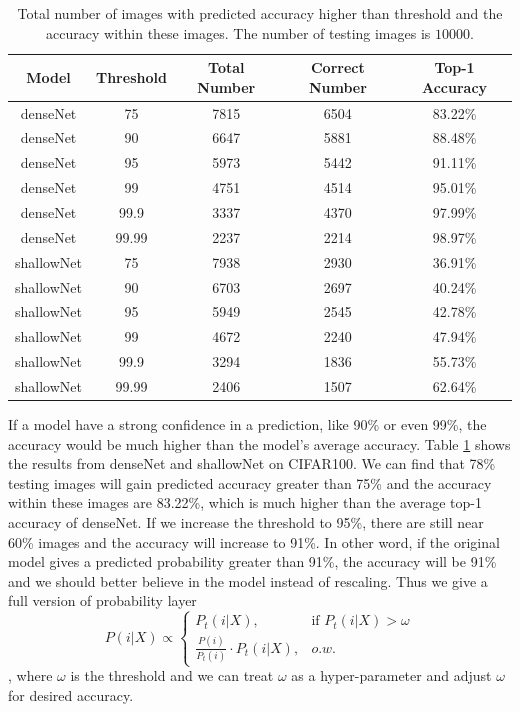 \documentclass{article}
\begin{document}
\begin{table}
\begin{center}
\begin{tabular}{ |c|c|c|c|c| } 
 \hline
 Model & Threshold & Total Number & Correct Number & Top-1 Accuracy \\
 \hline
 denseNet & 75 & 7815 & 6504 & 83.22\% \\
 \hline
 denseNet & 90 & 6647 & 5881 & 88.48\% \\
 \hline
 denseNet & 95 & 5973 & 5442 & 91.11\% \\
 \hline
 denseNet & 99 & 4751 & 4514 & 95.01\% \\
 \hline
 denseNet & 99.9 & 3337 & 4370 & 97.99\% \\
 \hline
 denseNet & 99.99 & 2237 & 2214 & 98.97\% \\
 \hline
 shallowNet & 75 & 7938 & 2930 & 36.91\% \\
 \hline
 shallowNet & 90 & 6703 & 2697 & 40.24\% \\
 \hline
 shallowNet & 95 & 5949 & 2545 & 42.78\% \\
 \hline
 shallowNet & 99 & 4672 & 2240 & 47.94\% \\
 \hline
 shallowNet & 99.9 & 3294 & 1836 & 55.73\% \\
 \hline
 shallowNet & 99.99 & 2406 & 1507 & 62.64\% \\
 \hline
\end{tabular}
\end{center}
\caption{Total number of images with predicted accuracy higher than threshold and the accuracy within these images. The number of testing images is $10000$.}
\label{table:threshold}
\end{table}
If a model have a strong confidence in a prediction, like 90\% or even 99\%, the accuracy would be much higher than the model's average accuracy. Table \ref{table:threshold} shows the results from denseNet and shallowNet on CIFAR100. We can find that 78\% testing images will gain predicted accuracy greater than 75\% and the accuracy within these images are 83.22\%, which is much higher than the average top-1 accuracy of denseNet. If we increase the threshold to 95\%, there are still near 60\% images and the accuracy will increase to 91\%. In other word, if the original model gives a predicted probability greater than 91\%, the accuracy will be 91\% and we should better believe in the model instead of rescaling. Thus we give a full version of probability layer
\begin{equation}
P(i|X) \propto \begin{cases}
P_t(i|X), &\text{if $P_t(i|X)> \omega$}\\
\frac{P(i)}{P_t(i)} \cdot P_t(i|X), &\text{$o.w.$}
\end{cases}
\end{equation},
where $\omega$ is the threshold and we can treat $\omega$ as a hyper-parameter and adjust $\omega$ for desired accuracy. 
\end{document}
